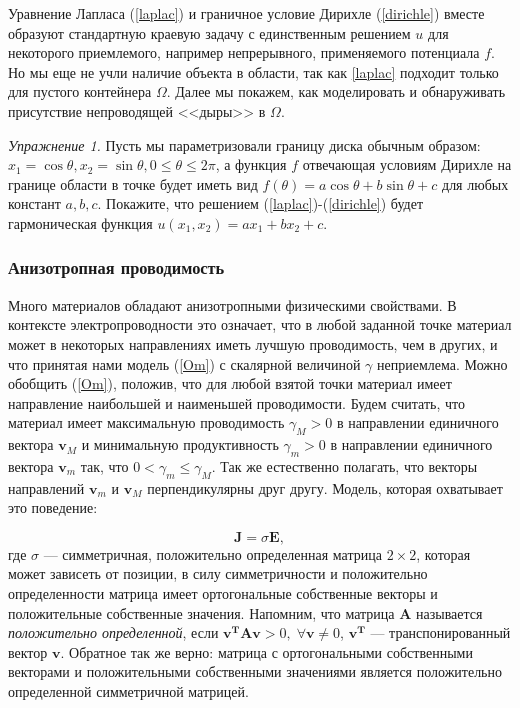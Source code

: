 \documentclass[a4paper, 12pt]{article}
\begin{document}
Уравнение Лапласа (\ref{laplac}) и граничное условие Дирихле (\ref{dirichle}) вместе 
образуют стандартную
краевую задачу с единственным решением $u$ для некоторого приемлемого, например 
непрерывного, применяемого
потенциала $f$. Но мы еще не учли наличие объекта в области, так как \ref{laplac} 
подходит только для
пустого контейнера $\Omega$. Далее мы покажем, как моделировать и обнаруживать 
присутствие непроводящей
<<дыры>> в $\Omega$.


\textit{Упражнение 1.\;} Пусть мы параметризовали границу диска обычным образом: $x_1 = 
\cos \theta, x_2 =
\sin \theta, 0 \le \theta \le 2 \pi$, а функция $f$  отвечающая условиям Дирихле на 
границе области в точке
будет иметь вид $f(\theta) = a \cos \theta + b \sin \theta + c$ для любых констант $a, 
b ,c$. Покажите, что
решением (\ref{laplac})-(\ref{dirichle}) будет гармоническая функция $u(x_1, x_2) = a 
x_1 + b x_2 + c$.

\subsubsection{Анизотропная проводимость}


Много материалов обладают анизотропными физическими свойствами. В контексте 
электропроводности это означает,
что в любой заданной точке материал может в некоторых направлениях иметь лучшую 
проводимость, чем в других,
и что принятая нами модель (\ref{Om}) с скалярной величиной $\gamma$ неприемлема. 
Можно обобщить (\ref{Om}),
положив, что для любой взятой точки материал имеет направление наибольшей и наименьшей 
проводимости. Будем
считать, что материал имеет максимальную проводимость $\gamma_M > 0$ в направлении 
единичного вектора
$\textbf{v}_M$ и минимальную продуктивность $\gamma_m > 0$ в направлении единичного 
вектора $\textbf{v}_m$
так, что $0 < \gamma_m \le \gamma_M$. Так же естественно полагать, что векторы 
направлений $\textbf{v}_m$ и
$\textbf{v}_M$ перпендикулярны друг другу. Модель, которая охватывает это поведение:

\begin{equation} \label{ani}
\textbf{J} = \sigma \textbf{E},
\end{equation}
где $\sigma$ --- симметричная, положительно определенная матрица $2 \times 2$, которая 
может зависеть от
позиции, в силу симметричности и положительно определенности матрица имеет 
ортогональные собственные векторы
и положительные собственные значения. Напомним, что матрица $\textbf{A}$ называется 
\textit{положительно
определенной}, если  $\textbf{v}^{\textbf{T}}\textbf{Av} > 0, \; \forall \textbf{v} 
\ne 0$,
$\textbf{v}^{\textbf{T}}$ --- транспонированный вектор $\textbf{v}$. Обратное так же 
верно: матрица с
ортогональными собственными векторами и положительными собственными значениями 
является положительно
определенной симметричной матрицей.
\end{document}
